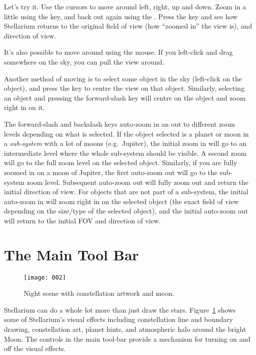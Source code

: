 Let's try it. Use the cursors to move around left, right, up and down.
Zoom in a little using the  key, and back out again using the
. Press the \key{\textbackslash} key and see how Stellarium returns to the
original field of view (how ``zoomed in'' the view is), and direction of
view.

It's also possible to move around using the mouse. If you left-click and
drag somewhere on the sky, you can pull the view around.

Another method of moving is to select some object in the sky (left-click
on the object), and press the  key to centre the view on that
object. Similarly, selecting an object and pressing the forward-slash
key \key{/} will centre on the object and zoom right in on it.

The forward-slash \key{/} and backslash \key{\textbackslash} keys auto-zoom in an out to different
zoom levels depending on what is selected. If the object selected is a planet
or moon in a \emph{sub-system} with a lot of moons (e.g.\ Jupiter), the
initial zoom in will go to an intermediate level where the whole
sub-system should be visible. A second zoom will go to the full zoom
level on the selected object. Similarly, if you are fully zoomed in on a
moon of Jupiter, the first auto-zoom out will go to the sub-system zoom
level. Subsequent auto-zoom out will fully zoom out and return the
initial direction of view. For objects that are not part of a
sub-system, the initial auto-zoom in will zoom right in on the selected
object (the exact field of view depending on the size/type of the
selected object), and the initial auto-zoom out will return to the
initial FOV and direction of view.

\section{The Main Tool Bar}
\label{sec:tour:toolbar}

\begin{figure}[htb]
\centering\texttt{[image: 002]}
\caption{Night scene with constellation artwork and moon.}
\label{fig:002}
\end{figure}

Stellarium can do a whole lot more than just draw the stars. Figure~\ref{fig:002}
shows some of Stellarium's visual effects including constellation
line and boundary drawing, constellation art, planet hints, and
atmospheric halo around the bright Moon. The controls in the main tool-bar
provide a mechanism for turning on and off the visual effects.

